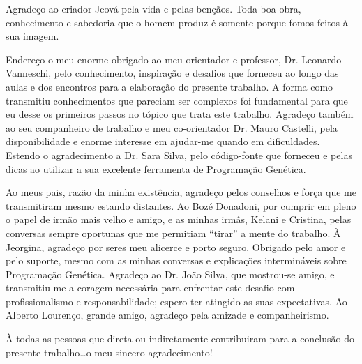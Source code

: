 \begin{acknowledgments}

Agradeço ao criador Jeová pela vida e pelas bençãos. Toda boa obra, conhecimento e sabedoria que o homem produz é somente porque fomos feitos 
à sua imagem.



Endereço o meu enorme obrigado ao meu orientador e professor, Dr. Leonardo Vanneschi, pelo conhecimento, inspiração e desafios que forneceu
ao longo das aulas e dos encontros para a elaboração do presente trabalho. A forma como transmitiu conhecimentos que pareciam ser complexos
foi fundamental para que eu desse os primeiros passos no tópico que trata este trabalho. Agradeço também ao seu companheiro de trabalho e
meu co-orientador Dr. Mauro Castelli, pela disponibilidade e enorme interesse em ajudar-me quando em dificuldades. Estendo o agradecimento
a Dr. Sara Silva, pelo código-fonte que forneceu e pelas dicas ao utilizar a sua excelente ferramenta de Programação Genética.



Ao meus pais, razão da minha existência, agradeço pelos conselhos e força que me transmitiram mesmo estando distantes. Ao
Bozé Donadoni, por cumprir em pleno o papel de irmão mais velho e amigo, e as minhas irmâs, Kelani e Cristina, pelas conversas sempre
oportunas que me permitiam ``tirar'' a mente do trabalho. À Jeorgina, agradeço por seres meu alicerce e porto seguro. Obrigado pelo amor e pelo suporte, mesmo com as minhas conversas
e explicações intermináveis sobre Programação Genética. Agradeço ao Dr. João Silva, que mostrou-se amigo, e transmitiu-me a coragem necessária para enfrentar este desafio com profissionalismo 
e responsabilidade; espero ter atingido as suas expectativas. Ao Alberto Lourenço, grande amigo, agradeço pela amizade e companheirismo.%



À todas as pessoas que direta ou indiretamente contribuiram para a conclusão do presente trabalho\ldots o meu sincero agradecimento!

\end{acknowledgments}
\clearpage
\thispagestyle{empty}
\cleardoublepage